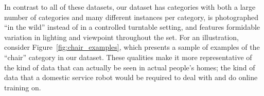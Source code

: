 In contrast to all of these datasets, our dataset has categories with both a large number of categories and many different instances per category, is photographed ``in the wild'' instead of in a controlled turntable setting, and features formidable variation in lighting and viewpoint throughout the set.
For an illustration, consider Figure~\ref{fig:chair_examples}, which presents a sample of examples of the ``chair'' category in our dataset.
These qualities make it more representative of the kind of data that can actually be seen in actual people's homes; the kind of data that a domestic service robot would be required to deal with and do online training on.
